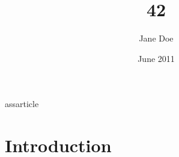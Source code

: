 ass{article}
\usepackage[utf8]{inputenc}

\title{42}
\author{Jane Doe}
\date{June 2011}



\maketitle

\section{Introduction}




